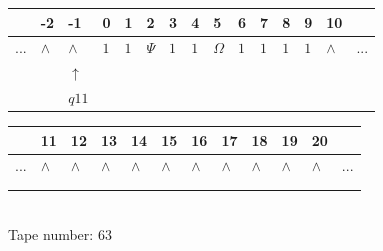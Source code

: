 \documentclass[11pt]{article}
\begin{document}
\begin{table}[H]
\centering
\begin{tabular}{lllllllllllllll}
 & -2 & -1 & 0 & 1 & 2 & 3 & 4 & 5 & 6 & 7 & 8 & 9 & 10 & \\
\hline
$...$ & \multicolumn{1}{|l|}{$\wedge$} & \multicolumn{1}{|l|}{$\wedge$} & \multicolumn{1}{|l|}{$1$} & \multicolumn{1}{|l|}{$1$} & \multicolumn{1}{|l|}{$\Psi$} & \multicolumn{1}{|l|}{$1$} & \multicolumn{1}{|l|}{$1$} & \multicolumn{1}{|l|}{$\Omega$} & \multicolumn{1}{|l|}{$1$} & \multicolumn{1}{|l|}{$1$} & \multicolumn{1}{|l|}{$1$} & \multicolumn{1}{|l|}{$1$} & \multicolumn{1}{|l|}{$\wedge$} & $...$\\
\hline
&  & $\uparrow$ &  &  &  &  &  &  &  &  &  &  &  &  \\
&  & $ q11 $ &  &  &  &  &  &  &  &  &  &  &  &  \\
\end{tabular}
\begin{tabular}{llllllllllll}
 & 11 & 12 & 13 & 14 & 15 & 16 & 17 & 18 & 19 & 20 & \\
\hline
$...$ & \multicolumn{1}{|l|}{$\wedge$} & \multicolumn{1}{|l|}{$\wedge$} & \multicolumn{1}{|l|}{$\wedge$} & \multicolumn{1}{|l|}{$\wedge$} & \multicolumn{1}{|l|}{$\wedge$} & \multicolumn{1}{|l|}{$\wedge$} & \multicolumn{1}{|l|}{$\wedge$} & \multicolumn{1}{|l|}{$\wedge$} & \multicolumn{1}{|l|}{$\wedge$} & \multicolumn{1}{|l|}{$\wedge$} & $...$\\
\hline
&  &  &  &  &  &  &  &  &  &  &  \\
&  &  &  &  &  &  &  &  &  &  &  \\
\end{tabular}
\\
Tape number: 63
\noindent\makebox[\linewidth]{\hdashrule{\textwidth}{1pt}{1pt}}\end{table}
\clearpage
\end{document}
